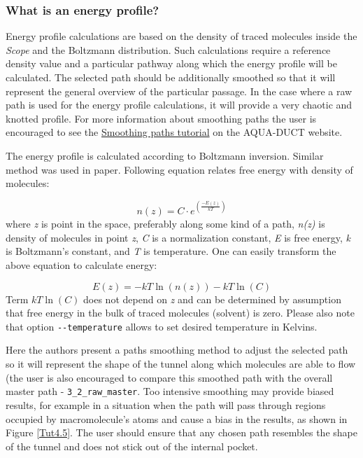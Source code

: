 \documentclass[9pt,tutorial]{livecoms}
\begin{document}
\subsubsection{What is an energy profile?}
Energy profile calculations are based on the density of traced molecules inside the \emph{Scope} and the Boltzmann distribution. Such calculations require a reference density value and a particular pathway along which the energy profile will be calculated. The selected path should be additionally smoothed so that it will represent the general overview of the particular passage. In the case where a raw path is used for the energy profile calculations, it will provide a very chaotic and knotted profile. For more information about smoothing paths the user is encouraged to see the \href{http://www.aquaduct.pl/smoothing-paths/}{Smoothing paths tutorial} on the AQUA-DUCT website.

The energy profile is calculated according to Boltzmann inversion. Similar method was used in \cite{Rao2017} paper. Following equation relates free energy with density of molecules:

\[ \textstyle n\left(z\right) = C \cdot \textstyle e^{ \textstyle \left(\frac{-E\left(z\right)}{kT}\right)} \]
where \textit{z} is point in the space, preferably along some kind of a path, \textit{n(z)} is density of molecules in point \textit{z}, \textit{C} is a normalization constant, \textit{E} is free energy, \textit{k} is Boltzmann’s constant, and \textit{T} is temperature.
One can easily transform the above equation to calculate energy:

\[ \displaystyle E\left(z\right) = -kT\ln\left( n\left( z\right)\right) - kT\ln\left(C\right) \]
Term \( \displaystyle kT\ln\left(C\right)\) does not depend on \textit{z} and can be determined by assumption that free energy in the bulk of traced molecules (solvent) is zero. Please also note that option \texttt{-{}-temperature} allows to set desired temperature in Kelvins.

Here the authors present a paths smoothing method to adjust the selected path so it will represent the shape of the tunnel along which molecules are able to flow (the user is also encouraged to compare this smoothed path with the overall master path -  \texttt{3\_2\_raw\_master}. Too intensive smoothing may provide biased results, for example in a situation when the path will pass through regions occupied by macromolecule's atoms and cause a bias in the results, as shown in Figure \ref{Tut4.5}. The user should ensure that any chosen path resembles the shape of the tunnel and does not stick out of the internal pocket.
\end{document}
